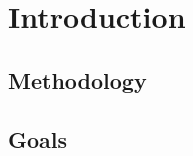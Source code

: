 \cleardoublepage

\chapter{Introduction}
\label{Ch1:Intro}

\section{Methodology}
\label{Ch1.1:TPlat}

\section{Goals}
\label{Ch1.2:TQP}
